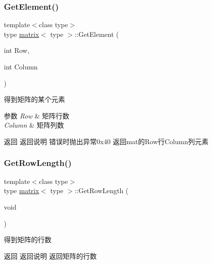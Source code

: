 \subsubsection{\texorpdfstring{Get\+Element()}{GetElement()}}
{\footnotesize\ttfamily template$<$class type$>$ \\
type \mbox{\hyperlink{classmatrix}{matrix}}$<$ type $>$\+::Get\+Element (\begin{DoxyParamCaption}\item[{int}]{Row,  }\item[{int}]{Column }\end{DoxyParamCaption})\hspace{0.3cm}{\ttfamily [inline]}}



得到矩阵的某个元素 


\begin{DoxyParams}{参数}
{\em Row} & 矩阵行数 \\
\hline
{\em Column} & 矩阵列数\\
\hline
\end{DoxyParams}
\begin{DoxyReturn}{返回}
返回说明 错误时抛出异常0x40 返回mat的\+Row行\+Column列元素 
\end{DoxyReturn}
\mbox{\label{classmatrix_a1db0593aa62235f24143913564382990}} 
\subsubsection{\texorpdfstring{Get\+Row\+Length()}{GetRowLength()}}
{\footnotesize\ttfamily template$<$class type$>$ \\
type \mbox{\hyperlink{classmatrix}{matrix}}$<$ type $>$\+::Get\+Row\+Length (\begin{DoxyParamCaption}\item[{void}]{ }\end{DoxyParamCaption})\hspace{0.3cm}{\ttfamily [inline]}}



得到矩阵的行数 

\begin{DoxyReturn}{返回}
返回说明 返回矩阵的行数 
\end{DoxyReturn}
\mbox{\label{classmatrix_a7f2bec444e35753d7225daf48e04e677}} 
